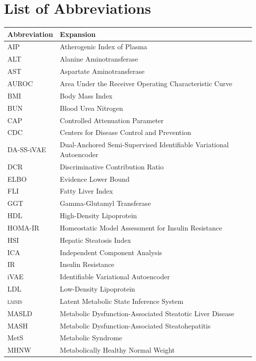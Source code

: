 \documentclass[12pt,a4paper,oneside]{report}
\newcommand{\lmsis}{\textsc{lmsis}}
\newcommand{\daivae}{DA-SS-iVAE}
\begin{document}
\chapter*{List of Abbreviations}
\begin{tabular}{@{}ll@{}}
\toprule
\textbf{Abbreviation} & \textbf{Expansion} \\
\midrule
AIP       & Atherogenic Index of Plasma \\
ALT       & Alanine Aminotransferase \\
AST       & Aspartate Aminotransferase \\
AUROC     & Area Under the Receiver Operating Characteristic Curve \\
BMI       & Body Mass Index \\
BUN       & Blood Urea Nitrogen \\
CAP       & Controlled Attenuation Parameter \\
CDC       & Centers for Disease Control and Prevention \\
\daivae{} & Dual-Anchored Semi-Supervised Identifiable Variational Autoencoder \\
DCR       & Discriminative Contribution Ratio \\
ELBO      & Evidence Lower Bound \\
FLI       & Fatty Liver Index \\
GGT       & Gamma-Glutamyl Transferase \\
HDL       & High-Density Lipoprotein \\
HOMA-IR   & Homeostatic Model Assessment for Insulin Resistance \\
HSI       & Hepatic Steatosis Index \\
ICA       & Independent Component Analysis \\
IR        & Insulin Resistance \\
iVAE      & Identifiable Variational Autoencoder \\
LDL       & Low-Density Lipoprotein \\
\lmsis{}  & Latent Metabolic State Inference System \\
MASLD     & Metabolic Dysfunction-Associated Steatotic Liver Disease \\
MASH      & Metabolic Dysfunction-Associated Steatohepatitis \\
MetS      & Metabolic Syndrome \\
MHNW      & Metabolically Healthy Normal Weight \\

\end{tabular}
\end{document}
